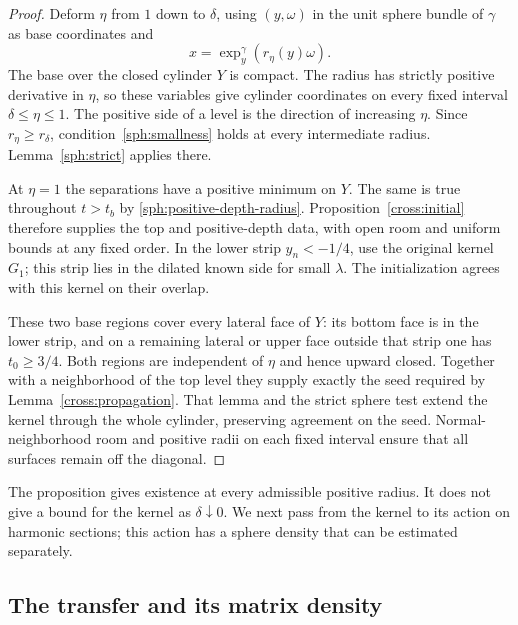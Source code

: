 \begin{proof}
Deform $\eta$ from $1$ down to $\delta$, using $(y,\omega)$ in the
unit sphere bundle of $\gamma$ as base coordinates and
\[
 x=\exp_y^\gamma(r_\eta(y)\omega).
\]
The base over the closed cylinder $Y$ is compact.  The radius has
strictly positive derivative in $\eta$, so these variables give
cylinder coordinates on every fixed interval $\delta\le\eta\le1$.
The positive side of a level is the direction of increasing $\eta$.
Since $r_\eta\ge r_\delta$, condition~\eqref{sph:smallness} holds
at every intermediate radius.  Lemma~\ref{sph:strict} applies there.

At $\eta=1$ the separations have a positive minimum on $Y$.
The same is true throughout $t>t_b$ by
\eqref{sph:positive-depth-radius}.  Proposition~\ref{cross:initial}
therefore supplies the top and positive-depth data, with open room and
uniform bounds at any fixed order.  In the lower strip $y_n<-1/4$,
use the original kernel $G_1$; this strip lies in the dilated known
side for small $\lambda$.  The initialization agrees with this kernel
on their overlap.

These two base regions cover every lateral face of $Y$: its bottom
face is in the lower strip, and on a remaining lateral or upper face
outside that strip one has $t_0\ge3/4$.  Both regions are independent
of $\eta$ and hence upward closed.  Together with a neighborhood of
the top level they supply exactly the seed required by
Lemma~\ref{cross:propagation}.  That lemma and the strict sphere test
extend the kernel through the whole cylinder, preserving agreement
on the seed.  Normal-neighborhood room and positive radii on each
fixed interval ensure that all surfaces remain off the diagonal.
\end{proof}

The proposition gives existence at every admissible positive radius.
It does not give a bound for the kernel as $\delta\downarrow0$.
We next pass from the kernel to its action on harmonic sections;
this action has a sphere density that can be estimated separately.

\subsection{The transfer and its matrix density}

